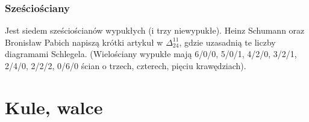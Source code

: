 \subsubsection{Sześciościany}
Jest siedem sześciościanów wypukłych (i trzy niewypukłe).
Heinz Schumann oraz Bronisław Pabich napiszą krótki artykuł w $\Delta_{24}^{11}$, gdzie uzasadnią te liczby diagramami Schlegela.
%
(Wielościany wypukłe mają 6/0/0, 5/0/1, 4/2/0, 3/2/1, 2/4/0, 2/2/2, 0/6/0 ścian o trzech, czterech, pięciu krawędziach).

\section{Kule, walce}
